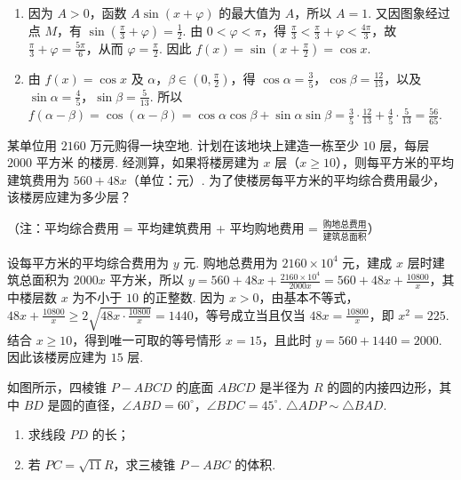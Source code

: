 \begin{solution}
\begin{enumerate}
\item 因为 \(A>0\)，函数 \(A\sin(x+\varphi)\) 的最大值为 \(A\)，所以 \(A=1\). 又因图象经过点 \(M\)，有 \(\sin\left(\frac\pi3+\varphi\right)=\frac12\). 由 \(0<\varphi<\pi\)，得 \(\frac\pi3<\frac\pi3+\varphi<\frac{4\pi}3\)，故 \(\frac\pi3+\varphi=\frac{5\pi}6\)，从而 \(\varphi=\frac\pi2\). 因此 \(f(x)=\sin\left(x+\frac\pi2\right)=\cos x\).

\item 由 \(f(x)=\cos x\) 及 \(\alpha\)，\(\beta\in\left(0,\frac\pi2\right)\)，得
\(\cos\alpha=\frac35\)，\(\cos\beta=\frac{12}{13}\)，以及 \(\sin\alpha=\frac45\)，\(\sin\beta=\frac5{13}\). 所以
\(f(\alpha-\beta)=\cos(\alpha-\beta)=\cos\alpha\cos\beta+\sin\alpha\sin\beta=\frac35\cdot\frac{12}{13}+\frac45\cdot\frac5{13}=\frac{56}{65}\).
\end{enumerate}
\end{solution}

\begin{problem}
某单位用 \(2160\) 万元购得一块空地. 计划在该地块上建造一栋至少 \(10\) 层，每层 \(2000\text{ 平方米}\) 的楼房. 经测算，如果将楼房建为 \(x\) 层（\(x \geqslant 10\)），则每平方米的平均建筑费用为 \(560 + 48x\)（单位：元）. 为了使楼房每平方米的平均综合费用最少，该楼房应建为多少层？

（注：平均综合费用 = 平均建筑费用 + 平均购地费用 = \(\frac{\text{购地总费用}}{\text{建筑总面积}}\)）
\end{problem}

\begin{solution}
设每平方米的平均综合费用为 \(y\) 元. 购地总费用为 \(2160\times10^4\) 元，建成 \(x\) 层时建筑总面积为 \(2000x\) 平方米，所以
\(y=560+48x+\frac{2160\times10^4}{2000x}=560+48x+\frac{10800}{x}\)，其中楼层数 \(x\) 为不小于 \(10\) 的正整数. 因为 \(x>0\)，由基本不等式，
\(48x+\frac{10800}{x}\geqslant2\sqrt{48x\cdot\frac{10800}{x}}=1440\)，等号成立当且仅当 \(48x=\frac{10800}{x}\)，即 \(x^2=225\). 结合 \(x\geqslant10\)，得到唯一可取的等号情形 \(x=15\)，且此时 \(y=560+1440=2000\). 因此该楼房应建为 \(15\) 层.
\end{solution}

\begin{problem}
如图所示，四棱锥 \(P - ABCD\) 的底面 \(ABCD\) 是半径为 \(R\) 的圆的内接四边形，其中 \(BD\) 是圆的直径，\(\angle ABD = 60^\circ\)，\(\angle BDC = 45^\circ\). \(\triangle ADP \sim \triangle BAD\).

\begin{enumerate}
\item 求线段 \(PD\) 的长；
\item 若 \(PC = \sqrt{11}R\)，求三棱锥 \(P - ABC\) 的体积.
\end{enumerate}

\end{problem}

